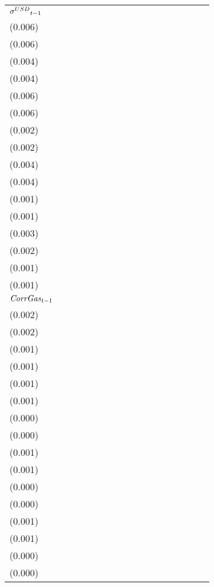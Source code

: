 \begin{tabular}{lllllllllllllllll}
${{\it \sigma}^{USD}}_{t-1}$ &   \makecell{$0.105^{**}$ \\(0.006)} &   \makecell{$0.122^{**}$ \\(0.006)} &   \makecell{$0.012^{**}$ \\(0.004)} &  \makecell{$0.015^{**}$ \\(0.004)} &    \makecell{$-0.006^{}$ \\(0.006)} &   \makecell{$-0.013^{*}$ \\(0.006)} &    \makecell{$-0.000^{}$ \\(0.002)} &    \makecell{$-0.000^{}$ \\(0.002)} &   \makecell{$-0.009^{*}$ \\(0.004)} &  \makecell{$-0.013^{**}$ \\(0.004)} &    \makecell{$-0.000^{}$ \\(0.001)} &    \makecell{$-0.000^{}$ \\(0.001)} &   \makecell{$0.028^{**}$ \\(0.003)} &  \makecell{$0.034^{**}$ \\(0.002)} &    \makecell{$0.001^{}$ \\(0.001)} &    \makecell{$0.002^{}$ \\(0.001)} \\
${{\it CorrGas}}_{t-1}$      &    \makecell{$-0.000^{}$ \\(0.002)} &    \makecell{$-0.002^{}$ \\(0.002)} &    \makecell{$-0.001^{}$ \\(0.001)} &   \makecell{$-0.001^{}$ \\(0.001)} &     \makecell{$0.002^{}$ \\(0.001)} &     \makecell{$0.001^{}$ \\(0.001)} &    \makecell{$-0.000^{}$ \\(0.000)} &    \makecell{$-0.000^{}$ \\(0.000)} &     \makecell{$0.001^{}$ \\(0.001)} &     \makecell{$0.000^{}$ \\(0.001)} &    \makecell{$-0.000^{}$ \\(0.000)} &    \makecell{$-0.000^{}$ \\(0.000)} &    \makecell{$-0.001^{}$ \\(0.001)} &   \makecell{$-0.001^{}$ \\(0.001)} &   \makecell{$-0.000^{}$ \\(0.000)} &   \makecell{$-0.000^{}$ \\(0.000)} \\

\end{tabular}
